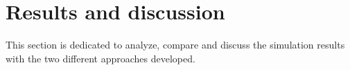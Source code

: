 \section{Results and discussion}
\label{results}
This section is dedicated to analyze, compare and discuss the simulation results with the two different approaches developed.